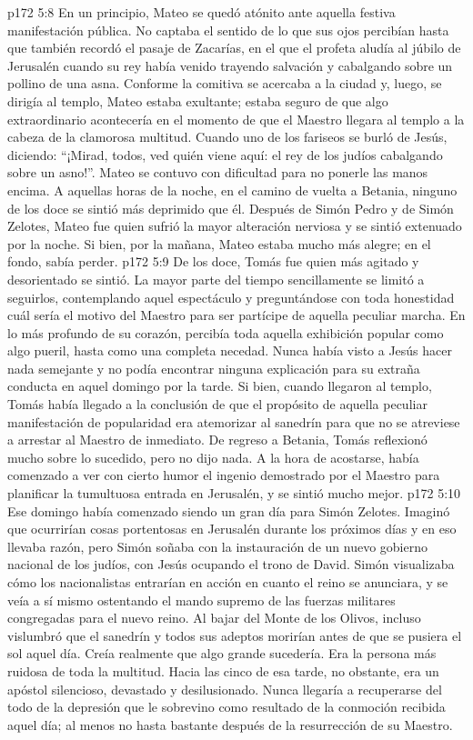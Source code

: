 \vs p172 5:8 \pc En un principio, Mateo se quedó atónito ante aquella festiva manifestación pública. No captaba el sentido de lo que sus ojos percibían hasta que también recordó el pasaje de Zacarías, en el que el profeta aludía al júbilo de Jerusalén cuando su rey había venido trayendo salvación y cabalgando sobre un pollino de una asna. Conforme la comitiva se acercaba a la ciudad y, luego, se dirigía al templo, Mateo estaba exultante; estaba seguro de que algo extraordinario acontecería en el momento de que el Maestro llegara al templo a la cabeza de la clamorosa multitud. Cuando uno de los fariseos se burló de Jesús, diciendo: “¡Mirad, todos, ved quién viene aquí: el rey de los judíos cabalgando sobre un asno!”. Mateo se contuvo con dificultad para no ponerle las manos encima. A aquellas horas de la noche, en el camino de vuelta a Betania, ninguno de los doce se sintió más deprimido que él. Después de Simón Pedro y de Simón Zelotes, Mateo fue quien sufrió la mayor alteración nerviosa y se sintió extenuado por la noche. Si bien, por la mañana, Mateo estaba mucho más alegre; en el fondo, sabía perder.
\vs p172 5:9 \pc De los doce, Tomás fue quien más agitado y desorientado se sintió. La mayor parte del tiempo sencillamente se limitó a seguirlos, contemplando aquel espectáculo y preguntándose con toda honestidad cuál sería el motivo del Maestro para ser partícipe de aquella peculiar marcha. En lo más profundo de su corazón, percibía toda aquella exhibición popular como algo pueril, hasta como una completa necedad. Nunca había visto a Jesús hacer nada semejante y no podía encontrar ninguna explicación para su extraña conducta en aquel domingo por la tarde. Si bien, cuando llegaron al templo, Tomás había llegado a la conclusión de que el propósito de aquella peculiar manifestación de popularidad era atemorizar al sanedrín para que no se atreviese a arrestar al Maestro de inmediato. De regreso a Betania, Tomás reflexionó mucho sobre lo sucedido, pero no dijo nada. A la hora de acostarse, había comenzado a ver con cierto humor el ingenio demostrado por el Maestro para planificar la tumultuosa entrada en Jerusalén, y se sintió mucho mejor.
\vs p172 5:10 Ese domingo había comenzado siendo un gran día para Simón Zelotes. Imaginó que ocurrirían cosas portentosas en Jerusalén durante los próximos días y en eso llevaba razón, pero Simón soñaba con la instauración de un nuevo gobierno nacional de los judíos, con Jesús ocupando el trono de David. Simón visualizaba cómo los nacionalistas entrarían en acción en cuanto el reino se anunciara, y se veía a sí mismo ostentando el mando supremo de las fuerzas militares congregadas para el nuevo reino. Al bajar del Monte de los Olivos, incluso vislumbró que el sanedrín y todos sus adeptos morirían antes de que se pusiera el sol aquel día. Creía realmente que algo grande sucedería. Era la persona más ruidosa de toda la multitud. Hacia las cinco de esa tarde, no obstante, era un apóstol silencioso, devastado y desilusionado. Nunca llegaría a recuperarse del todo de la depresión que le sobrevino como resultado de la conmoción recibida aquel día; al menos no hasta bastante después de la resurrección de su Maestro.
